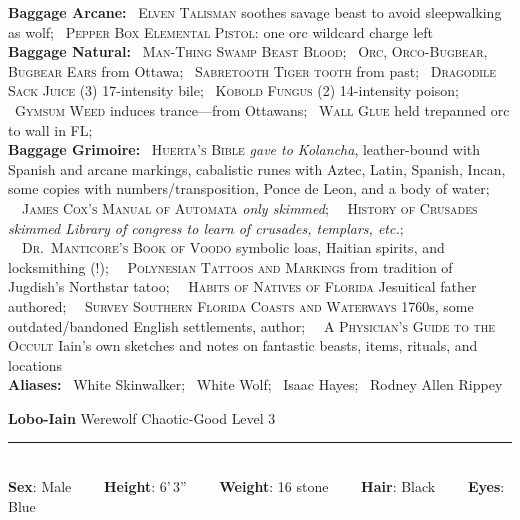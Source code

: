 \documentclass[11pt]{article}
\newcommand{\heading}[1]{{\sc\bfseries #1}}
\begin{document}
%
\heading{Baggage Arcane:}
\ \textsc{Elven Talisman} soothes savage beast to avoid sleepwalking
as wolf;
\ \textsc{Pepper Box Elemental Pistol:} one orc wildcard charge left
%
\\[6pt]
%
\heading{Baggage Natural:}
\ \textsc{Man-Thing Swamp Beast Blood};
\ \textsc{Orc, Orco-Bugbear, Bugbear Ears} from Ottawa;
\ \textsc{Sabretooth Tiger tooth} from past;
\ \textsc{Dragodile Sack Juice} (3) 17-intensity bile;
\ \textsc{Kobold Fungus} (2) 14-intensity poison;
\ \textsc{Gymsum Weed} induces trance---from Ottawans;
\ \textsc{Wall Glue} held trepanned orc to wall in FL;
%
\\[6pt]
%
\heading{Baggage Grimoire:}
\
\textsc{Huerta's Bible} {\it gave to Kolancha}, leather-bound with
Spanish and arcane markings, cabalistic runes with Aztec, Latin,
Spanish, Incan, some copies with numbers/transposition, Ponce de Leon,
and a body of water;
\ \
\textsc{James Cox's Manual of Automata} {\it only skimmed};
\ \
\textsc{History of Crusades} {\it skimmed Library of congress to learn
  of crusades, templars, etc.};
\ \
\textsc{Dr.\ Manticore's Book of Voodo} symbolic loas, Haitian
spirits, and locksmithing (!);
\ \
\textsc{Polynesian Tattoos and Markings} from tradition of Jugdish's
Northstar tatoo;
\ \
\textsc{Habits of Natives of Florida} Jesuitical father authored;
\ \
\textsc{Survey Southern Florida Coasts and Waterways} 1760s, some
outdated/bandoned English settlements, author;
\ \
\textsc{A Physician's Guide to the Occult} Iain's own sketches and
notes on fantastic beasts, items, rituals, and locations
\\[6pt]
\heading{Aliases:} \ White Skinwalker; \ White Wolf; \ Isaac Hayes; \
Rodney Allen Rippey
%

\clearpage
\pagestyle{empty}
\noindent
{\huge\bfseries Lobo-Iain}
\hfill
{\Large Werewolf}
\hfill
{\Large Chaotic-Good}
\hfill
{\Large Level 3}
\\[-8pt]
\hrule

\mbox{ }
\\[6pt]
\heading{Sex}: Male
\ \ \ \
\heading{Height}: 6'\,3''
\ \ \ \
\heading{Weight}: 16 stone
\ \ \ \
\heading{Hair}: Black
\ \ \ \
\heading{Eyes}: Blue
\end{document}
